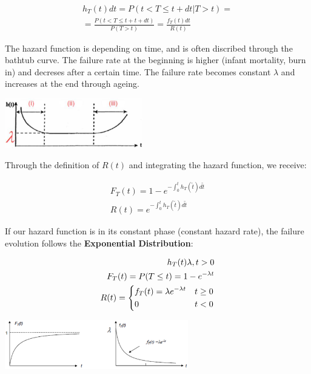 \documentclass[8pt, landscape, fleqn]{scrartcl}
\begin{document}
\begin{multicols*}{3}
 \begin{align}
     h_T(t) dt = P(t< T \leq t + dt | T>t) = \\
     = \frac{P(t<T \leq t+t+dt)}{P(T>t)} = \frac{f_T(t)dt}{R(t)}
 \end{align}

 The hazard function is depending on time, and is often discribed through the bathtub curve. The failure rate at the beginning is higher (infant mortality, burn in) and decreses after a certain time. The failure rate becomes constant $\lambda$ and increases at the end through ageing. 

 \begin{center}
     \includegraphics[width=6cm]{Images/Hazard_Function.png}
 \end{center}

 Through the definition of $R(t)$ and integrating the hazard function, we receive:

 \begin{align}
     F_T(t) = 1-e^{-\int_0^t h_T(\tilde{t}) d\tilde{t}} \\
     R(t) = e^{-\int_0^t h_T(\tilde{t}) d\tilde{t}}
 \end{align}

 If our hazard function is in its constant phase (constant hazard rate), the failure evolution follows the \textbf{Exponential Distribution}:

 \begin{align}
    h_T(t) \lambda, t>0 \\
     F_T(t) = P(T \leq t) = 1-e^{-\lambda t} \\
     R(t) = \begin{dcases}
         f_T(t) = \lambda e^{-\lambda t} & t \geq 0 \\
        0 & t < 0
     \end{dcases}
 \end{align}

 \begin{center}
     \includegraphics[width = 8cm]{Images/Exponential_Distribution.png}
 \end{center}


\end{multicols*}
\end{document}
